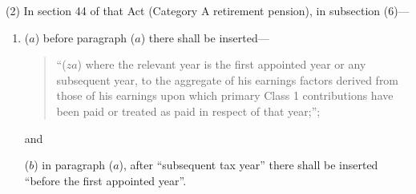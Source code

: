 \documentclass[12pt,a4paper]{article}
\begin{document}
(2) In section 44 of that Act (Category A retirement pension), in subsection (6)—
\begin{enumerate}\item[]
($a$) before paragraph ($a$)  there shall be inserted—
\begin{quotation}
“($za$) where the relevant year is the first appointed year or any subsequent year, to the aggregate of his earnings factors derived from those of his earnings upon which primary Class 1 contributions have been paid or treated as paid in respect of that year;”;
\end{quotation}
and

($b$) in paragraph ($a$), after “subsequent tax year” there shall be inserted “before the first appointed year”.
\end{enumerate}
\end{document}
